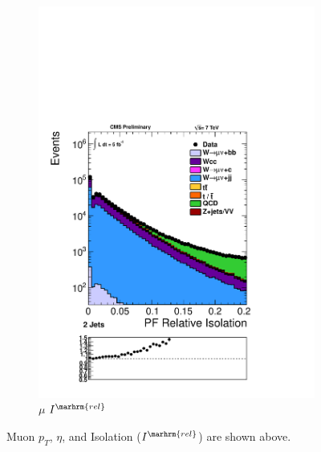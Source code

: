 \begin{figure}[hb]
\begin{subfigure}[b]{.45\textwidth}
	\includegraphics[trim = 0mm 52mm 0mm 0mm, clip,width=\textwidth]{images/muNuRelPFIso.pdf}
	\caption[]{$\mu$    $I^{\marhrm{rel}}$}
    \end{subfigure}
  \caption[]
   	{Muon $p_{T}$, $\eta$, and  Isolation ($I^\marhrm{rel}$) are shown above.}
    \label{fig:muonvariables}
\end{figure}

